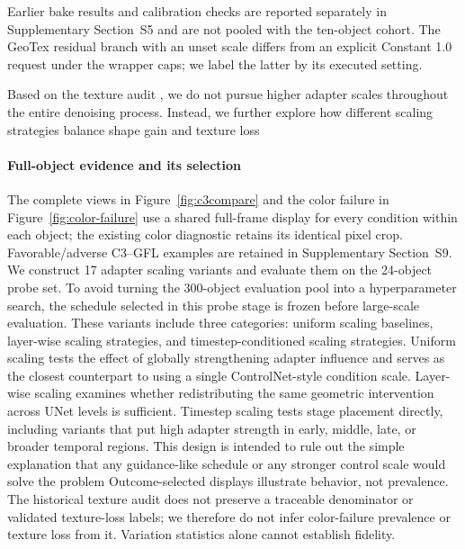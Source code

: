 \documentclass[times,twocolumn,final]{elsarticle}
\providecommand{\DIFadd}[1]{{\protect\color{blue} \sf #1}} %
\providecommand{\DIFdel}[1]{{\protect\color{red} \scriptsize #1}} %
\providecommand{\DIFaddbegin}{} %
\providecommand{\DIFaddend}{} %
\providecommand{\DIFdelbegin}{} %
\providecommand{\DIFdelend}{} %
\begin{document}
\DIFdelend \DIFaddbegin \DIFadd{Earlier bake results and calibration checks are reported separately in Supplementary Section~S5 and are not pooled with the ten-object cohort. The GeoTex residual branch with an unset scale differs from an explicit Constant 1.0 request under the wrapper caps; we label the latter by its executed setting.
}\DIFaddend

\DIFdelbegin \DIFdel{Based on the texture audit , we do not pursue higher adapter scales throughout the entire denoising process. Instead, we further explore how different scaling strategies balance shape gain and texture loss }\DIFdelend \DIFaddbegin \paragraph{Full-object evidence and its selection}
\DIFadd{The complete views in Figure~\ref{fig:c3compare} and the color failure in Figure~\ref{fig:color-failure} use a shared full-frame display for every condition within each object; the existing color diagnostic retains its identical pixel crop. Favorable/adverse C3--GFL examples are retained in Supplementary Section~S9}\DIFaddend . \DIFdelbegin \DIFdel{We construct 17 adapter scaling variants and evaluate them on the 24-object probe set.
To avoid turning the 300-object evaluation pool into a hyperparameter search, the schedule selected in this probe stage is frozen before large-scale evaluation. These variants include three categories: uniform scaling baselines, layer-wise scaling strategies, and timestep-conditioned scaling strategies. Uniform scaling tests the effect of globally strengthening adapter influence and serves as the closest counterpart to using a single ControlNet-style condition scale. Layer-wise scaling examines whether redistributing the same geometric intervention across UNet levels is sufficient. Timestep scaling tests stage placement directly, including variants that put high adapter strength in early, middle, late, or broader temporal regions. This design is intended to rule out the simple explanation that any guidance-like schedule or any stronger control scale would solve the problem}\DIFdelend \DIFaddbegin \DIFadd{Outcome-selected displays illustrate behavior, not prevalence. The historical texture audit does not preserve a traceable denominator or validated texture-loss labels; we therefore do not infer color-failure prevalence or texture loss from it. Variation statistics alone cannot establish fidelity.
}
\end{document}
